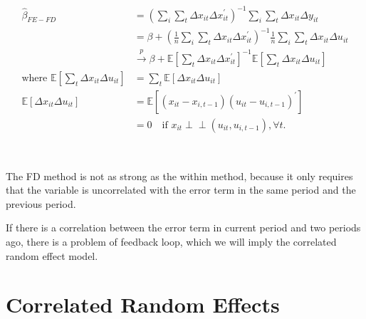 \begin{align*}
    \hat{\beta}_{FE-FD} &= \left(\sum_i \sum_t \Delta x_{it} \Delta x_{it}^{\prime} \right)^{-1} \sum_i \sum_t \Delta x_{it} \Delta y_{it} \\
    &= \beta + \left(\frac{1}{n} \sum_i \sum_t \Delta x_{it} \Delta x_{it}^{\prime} \right)^{-1} \frac{1}{n} \sum_i \sum_t \Delta x_{it} \Delta u_{it} \\
    &\overset{p}{\rightarrow} \beta + \mathbb{E}\left[\sum_t \Delta x_{it} \Delta x_{it}^{\prime} \right]^{-1} \mathbb{E}\left[\sum_t \Delta x_{it} \Delta u_{it} \right] \\
    \text{where } \mathbb{E}\left[\sum_t \Delta x_{it} \Delta u_{it}\right] &= \sum_t \mathbb{E}\left[\Delta x_{it} \Delta u_{it} \right]\\
    \mathbb{E}\left[\Delta x_{it} \Delta u_{it} \right] &= \mathbb{E}\left[\left(x_{it} - x_{i, t-1} \right) \left(u_{it} - u_{i, t-1} \right)^{\prime} \right] \\
    &= 0 \quad \text{if } x_{it} \perp\!\!\!\perp (u_{it}, u_{i, t-1}), \forall t.
\end{align*}

\begin{note}
    \

    The FD method is not as strong as the within method, because it only requires that the variable is
    uncorrelated with the error term in the same period and the previous period.

    If there is a correlation between the error term in current period and two periods ago, there is a problem of feedback loop,
    which we will imply the correlated random effect model.
\end{note}

\section{Correlated Random Effects}